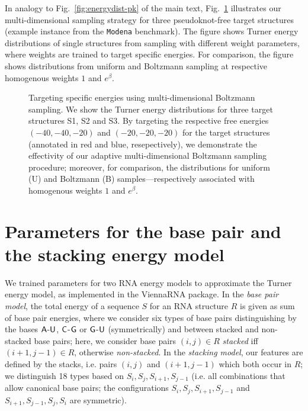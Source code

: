 \documentclass[10pt]{article}
\makeatletter
\newlength{\@aligneps}
\newcommand{\includegraphicstop}[2][]{%
\sbox{\@alignepsbox}{\texttt{[image: \#2]}}%
\setlength{\@aligneps}{-\ht\@alignepsbox}%
\addtolength{\@aligneps}{2ex}%
\raisebox{\@aligneps}{\usebox{\@alignepsbox}}}
\newcommand{\Def}[1]{\emph{#1}}
\newcommand{\Nuc}[1]{{\sf #1}}
\newcommand{\Ab}{\Nuc{A}}
\newcommand{\Cb}{\Nuc{C}}
\newcommand{\Gb}{\Nuc{G}}
\newcommand{\Ub}{\Nuc{U}}
\newcommand{\Software}[1]{{\ttfamily #1}}
\makeatother
\begin{document}
In analogy to Fig.~\ref{fig:energydist-pk} of the main text,
Fig.~\ref{fig:energydist} illustrates our multi-dimensional sampling
strategy for three pseudoknot-free target structures (example instance
from the \texttt{Modena} benchmark). The figure shows Turner energy
distributions of single structures from sampling with different weight
parameters, where weights are trained to target specific energies. For
comparison, the figure shows distributions from uniform and Boltzmann
sampling at respective homogenous weights $1$ and $e^\beta$.

\begin{figure}[t]
  \begin{center}
    \includegraphicstop[width=0.8\textwidth]{Figs/energy_distribution}
  \end{center}
  \caption{%
    Targeting specific energies using multi-dimensional Boltzmann
    sampling. We show the Turner energy distributions for
    three target structures S1, S2 and S3. By
    targeting the respective free energies $(-40,-40,-20)$ and
    $(-20,-20,-20)$ for the target structures (annotated in red and
    blue, resepectively), we demonstrate the
    effectivity of our adaptive multi-dimensional Boltzmann sampling
    procedure; moreover, for comparison, the distributions for uniform
    (U) and Boltzmann (B) samples---respectively associated with
    homogenous weights $1$ and $e^\beta$.
  }
  \label{fig:energydist}
\end{figure}


\section{Parameters for the base pair and the stacking energy model}
\label{appsec:modelparameters}

We trained parameters for two RNA energy models to approximate the
Turner energy model, as implemented in the \Software{ViennaRNA}
package.  In the \Def{base pair model}, the total energy of a sequence $S$
for an RNA structure $R$ is given as sum of base pair energies, where
we consider six types of base pairs distinguishing by the bases $\Ab$-$\Ub$,
$\Cb$-$\Gb$ or $\Gb$-$\Ub$ (symmetrically) and between stacked and non-stacked base
pairs; here, we consider base pairs $(i,j)\in R$ \Def{stacked} iff
$(i+1,j-1)\in R$, otherwise \Def{non-stacked}. In the \Def{stacking model},
our features are defined by the stacks, i.e. pairs $(i,j)$ and
$(i+1,j-1)$ which both occur in $R$; we distinguish 18 types based on
$S_i,S_j,S_{i+1},S_{j-1}$ (i.e. all combinations that allow canonical
base pairs; the configurations $S_i,S_j,S_{i+1},S_{j-1}$ and
$S_{i+1},S_{j-1},S_j,S_i$ are symmetric).
\end{document}
